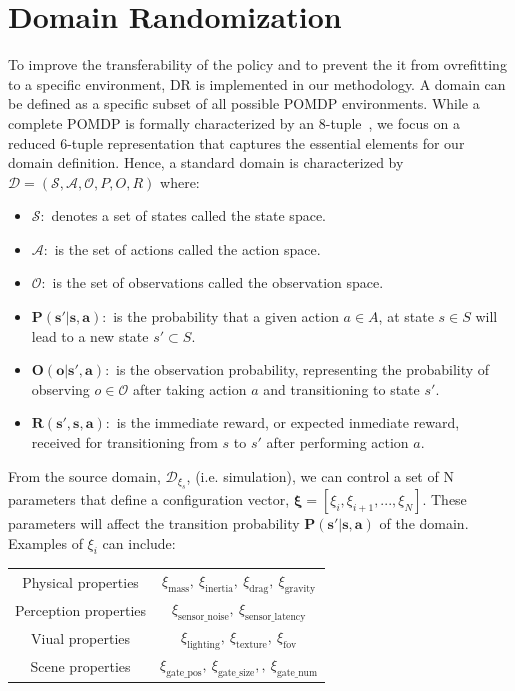 \newpage
\section{Domain Randomization}\label{sec:DR}
To improve the transferability of the policy and to prevent the it from ovrefitting to a specific environment, \ac{DR} is implemented in our methodology.
A domain can be defined as a specific subset of all possible \ac{POMDP} environments. 
While a complete \ac{POMDP} is formally characterized by an 8-tuple~\cite{ASTROM1965174}, 
we focus on a reduced 6-tuple representation that captures the essential elements 
for our domain definition. Hence, a standard domain is characterized by 
$\mathcal{D} = (\mathcal{S}, \mathcal{A}, \mathcal{O}, P, O, R)$ where:

\begin{itemize}
    \item $\mathbf{\mathcal{S}:}$ denotes a set of states called the state space.
    \item $\mathbf{\mathcal{A}:}$ is the set of actions called the action space.
    \item $\mathbf{\mathcal{O}:}$ is the set of observations called the observation space.
    \item $\mathbf{P(s'|s, a):}$ is the probability that a given action $a \in A$, at state $s \in S$ will lead to a new state $s' \subset S$. 
    \item $\mathbf{O(o|s', a):}$ is the observation probability, representing the probability of observing $o \in \mathcal{O}$ after taking action $a$ and transitioning to state $s'$.
    \item $\mathbf{R(s',s,a):}$ is the immediate reward, or expected inmediate reward, received for transitioning from $s$ to $s'$ after performing action $a$. 
\end{itemize}
From the source domain, $\mathcal{D}_{\xi_s}$, (i.e. simulation), we can control a set of N parameters that define a configuration vector, $\boldsymbol{\xi} = [\xi_i, \xi_{i+1}, ..., \xi_N]$.
These parameters will affect the transition probability $\mathbf{P(s'|s,a)}$ of the domain.
Examples of $\xi_i$ can include:

\begin{tabular}{c|c}

    Physical properties & $\xi_{\text{mass}}, \ \xi_{\text{inertia}}, \ \xi_{\text{drag}}, \ \xi_{\text{gravity}}$ \\
    Perception properties & $\xi_{\text{sensor\_noise}}, \ \xi_{\text{sensor\_latency}}$ \\
    Viual properties & $\xi_{\text{lighting}}, \ \xi_{\text{texture}}, \ \xi_{\text{fov}}$ \\
    Scene properties & $\xi_{\text{gate\_pos}}, \ \xi_{\text{gate\_size}}, , \ \xi_{\text{gate\_num}}$ \\
    
\end{tabular}

